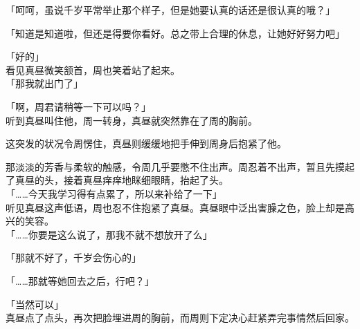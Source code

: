 「呵呵，虽说千岁平常举止那个样子，但是她要认真的话还是很认真的哦？」

「知道是知道啦，但还是得要你看好。总之带上合理的休息，让她好好努力吧」

「好的」\\

看见真昼微笑颔首，周也笑着站了起来。\\

「那我就出门了」

「啊，周君请稍等一下可以吗？」\\

听到真昼叫住他，周一转身，真昼就突然靠在了周的胸前。

这突发的状况令周愣住，真昼则缓缓地把手伸到周身后抱紧了他。

那淡淡的芳香与柔软的触感，令周几乎要憋不住出声。周忍着不出声，暂且先摸起了真昼的头，接着真昼痒痒地眯细眼睛，抬起了头。\\

「……今天我学习得有点累了，所以来补给了一下」\\

听见真昼这声低语，周也忍不住抱紧了真昼。真昼眼中泛出害臊之色，脸上却是高兴的笑容。\\

「……你要是这么说了，那我不就不想放开了么」

「那就不好了，千岁会伤心的」

「……那就等她回去之后，行吧？」

「当然可以」\\

真昼点了点头，再次把脸埋进周的胸前，而周则下定决心赶紧弄完事情然后回家。
